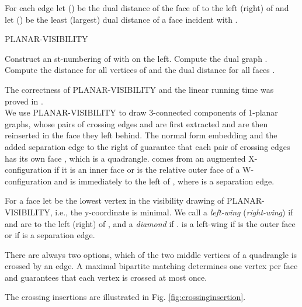 \documentclass[runningheads]{llncs}
\begin{document}
For each edge  let  () be the dual
distance  of the face  of  to the left (right) of
 and let  () be the least (largest) dual
distance
of a face incident with .\\





\begin{algorithm}
  \caption{PLANAR-VISIBILITY}\label{alg:planar-visibility}



Construct an st-numbering of   with  on the left.\;
  Compute the dual graph  .\;
  Compute the distance    for all vertices  of   and the dual
  distance  for all faces .\;
\end{algorithm}


 The correctness of  PLANAR-VISIBILITY and the linear
running time was proved in
\cite{dett-gdavg-99,rt-rplbopg-86, TT-vrpg-86}.\\



We use PLANAR-VISIBILITY to draw 3-connected components  of
1-planar graphs, whose pairs of crossing edges  and 
are first extracted  and are then  reinserted in the face they left
behind. The normal form embedding and the added separation edge
 to the right of  guarantee that each pair of crossing
edges has its own face , which is a quadrangle.  comes from an
augmented X-configuration if it is an inner face or is the relative
outer face of a W-configuration and is immediately to the left of
, where    is a separation edge.

For a face  let
  be the lowest vertex in the visibility drawing of PLANAR-VISIBILITY,
 i.e., the y-coordinate  is minimal. We call
 a \emph{left-wing} (\emph{right-wing}) if  and   are to the left (right) of  ,
and a \emph{diamond} if .  is a left-wing if  is the outer face or if
 is a separation edge.

There are always two options, which of the two middle vertices of a
quadrangle   is crossed by an edge. A maximal bipartite matching
determines one vertex per face and guarantees that each vertex is
crossed at most once.

The crossing insertions are illustrated in Fig.
\ref{fig:crossinginsertion}.
\end{document}

